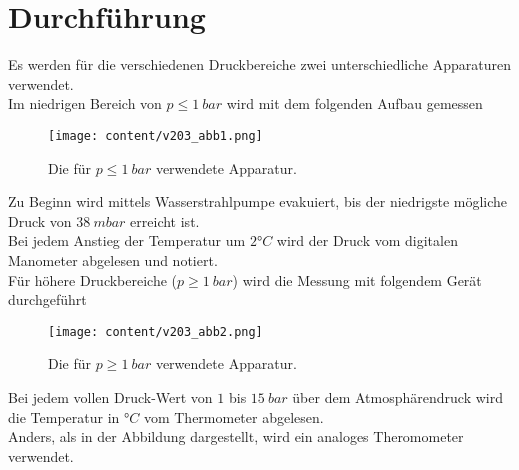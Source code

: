 \section{Durchführung}
\label{sec:Durchführung}

Es werden für die verschiedenen Druckbereiche zwei unterschiedliche Apparaturen verwendet. \\
Im niedrigen Bereich von $p \leqslant 1\:bar$ wird mit dem folgenden Aufbau gemessen

\begin{figure}[H]
    \centering
    \texttt{[image: content/v203\_abb1.png]}
    \caption{Die für $p \leqslant 1\:bar$ verwendete Apparatur. \cite{sample}}
    \label{abb:niedrigdruck}
\end{figure}
Zu Beginn wird mittels Wasserstrahlpumpe evakuiert, bis der niedrigste mögliche Druck von $38\:mbar$ erreicht ist.\\ %

Bei jedem Anstieg der Temperatur um $2°C$ wird der Druck vom digitalen Manometer abgelesen und notiert.\\


Für höhere Druckbereiche ($p \geqslant 1\:bar$) wird die Messung mit folgendem Gerät durchgeführt

\begin{figure}[H]
    \centering
    \texttt{[image: content/v203\_abb2.png]}
    \caption{Die für $p \geqslant 1\:bar$ verwendete Apparatur. \cite{sample}}
    \label{abb:hoherdruck}
\end{figure}

Bei jedem vollen Druck-Wert von $1$ bis $15\:bar$ über dem Atmosphärendruck wird die Temperatur in $°C$ vom Thermometer abgelesen.\\
Anders, als in der Abbildung dargestellt, wird ein analoges Theromometer verwendet.\\